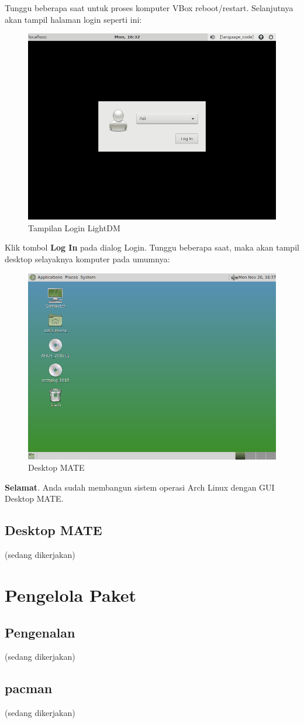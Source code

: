 \documentclass[12pt,]{article}
\begin{document}
	Tunggu beberapa saat untuk proses komputer VBox reboot/restart.
	Selanjutnya akan tampil halaman login seperti ini:
	\begin{figure}[H]
		\centering
		\includegraphics[width=0.4\linewidth]{images/vbox_gui/s1}
		\caption{Tampilan Login LightDM}
	\end{figure}
	Klik tombol \textbf{Log In} pada dialog Login.
	Tunggu beberapa saat, maka akan tampil desktop selayaknya komputer pada umumnya:
	\begin{figure}[H]
		\centering
		\includegraphics[width=0.4\linewidth]{images/vbox_gui/s2}
		\caption{Desktop MATE}
	\end{figure}
	\textbf{Selamat}. Anda sudah membangun sistem operasi Arch Linux dengan GUI Desktop MATE.
	
	\subsection{Desktop MATE}
	(sedang dikerjakan)

	\newpage
	\section{Pengelola Paket}
	
	\subsection{Pengenalan}
	(sedang dikerjakan)
	
	\subsection{pacman}
	(sedang dikerjakan)
\end{document}
